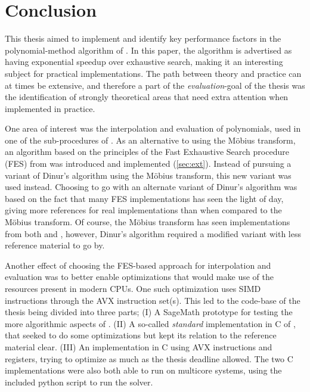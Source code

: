 \section{Conclusion} \label{sec:concl}

This thesis aimed to implement and identify key performance factors in the polynomial-method algorithm of \cite{eurocrypt-2021-30841}. In this paper, the algorithm is advertised as having exponential speedup over exhaustive search, making it an interesting subject for practical implementations. The path between theory and practice can at times be extensive, and therefore a part of the \textit{evaluation}-goal of the thesis was the identification of strongly theoretical areas that need extra attention when implemented in practice.

One area of interest was the interpolation and evaluation of polynomials, used in one of the sub-procedures of \cite{eurocrypt-2021-30841}. As an alternative to using the Möbius transform, an algorithm based on the principles of the Fast Exhaustive Search procedure (FES) from \cite{ches-2010-23990} was introduced and implemented (\cref{sec:ext}). Instead of pursuing a variant of Dinur's algorithm using the Möbius transform, this new variant was used instead. Choosing to go with an alternate variant of Dinur's algorithm was based on the fact that many FES implementations has seen the light of day, giving more references for real implementations than when compared to the Möbius transform. Of course, the Möbius transform has seen implementations from both \cite{cryptoeprint:2022/1412} and \cite{joux2009algorithmic}, however, Dinur's algorithm required a modified variant with less reference material to go by.

Another effect of choosing the FES-based approach for interpolation and evaluation was to better enable optimizations that would make use of the resources present in modern CPUs. One such optimization uses SIMD instructions through the AVX instruction set(s). This led to the code-base of the thesis being divided into three parts; (I) A SageMath prototype for testing the more algorithmic aspects of \cite{eurocrypt-2021-30841}. (II) A so-called \textit{standard} implementation in C of \cite{eurocrypt-2021-30841}, that seeked to do some optimizations but kept its relation to the reference material clear. (III) An implementation in C using AVX instructions and registers, trying to optimize as much as the thesis deadline allowed. The two C implementations were also both able to run on multicore systems, using the included python script to run the solver.

